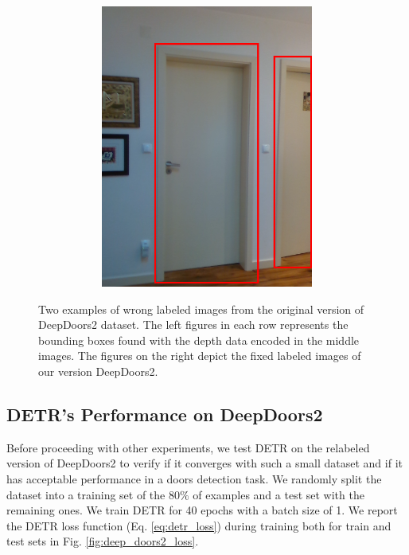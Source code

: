 \begin{figure}[h!]
\begin{subfigure}[b]{\linewidth}
\begin{subfigure}[b]{0.26\linewidth}
			\includegraphics[width=\linewidth]{images/deep_doors_2_labeling2_correct.png}
		\end{subfigure}
	\hfil
		\caption{}
	\end{subfigure}
	\caption{Two examples of wrong labeled images from the original version of DeepDoors2 dataset. The left figures in each row represents the bounding boxes found with the depth data encoded in the middle images. The figures on the right depict the fixed labeled images of our version DeepDoors2.}
	\label{fig:relabeling_deepdoors2}
\end{figure}

\subsection{DETR's Performance on DeepDoors2}

Before proceeding with other experiments, we test DETR on the relabeled version of DeepDoors2 to verify if it converges with such a small dataset and if it has acceptable performance in a doors detection task. We randomly split the dataset into a training set of the $80\%$ of examples and a test set with the remaining ones. We train DETR for 40 epochs with a batch size of 1. We report the DETR loss function (Eq. \ref{eq:detr_loss}) during training both for train and test sets in Fig. \ref{fig:deep_doors2_loss}.

